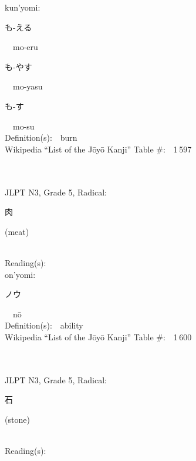 \begin{multicols}{2}
{\hspace*{1em}}kun'yomi:\ \ \\
{\hspace*{2em}}{\begin{CJK}{UTF8}{min} も-える \end{CJK}}\ \ mo-eru\ \ \\
{\hspace*{2em}}{\begin{CJK}{UTF8}{min} も-やす \end{CJK}}\ \ mo-yasu\ \ \\
{\hspace*{2em}}{\begin{CJK}{UTF8}{min} も-す \end{CJK}}\ \ mo-su\ \ \\
Definition(s):\ \ burn \\
Wikipedia ``List of the J\=oy\=o Kanji'' Table \#:\ \ 1\,597 \\
\ \ \\
{\fontsize{34pt}{40pt}  }\ \ \\  %
{JLPT N3, Grade 5, Radical:\ \ {\begin{CJK}{UTF8}{min} 肉 \end{CJK}} (meat) } \\
Reading(s):\ \ \\
{\hspace*{1em}}on'yomi:\ \ \\
{\hspace*{2em}}{\begin{CJK}{UTF8}{min} ノウ \end{CJK}}\ \ n\=o\ \ \\
Definition(s):\ \ ability \\
Wikipedia ``List of the J\=oy\=o Kanji'' Table \#:\ \ 1\,600 \\
\ \ \\
{\fontsize{34pt}{40pt}  }\ \ \\  %
{JLPT N3, Grade 5, Radical:\ \ {\begin{CJK}{UTF8}{min} 石 \end{CJK}} (stone) } \\
Reading(s):\ \ \\

\end{multicols}
